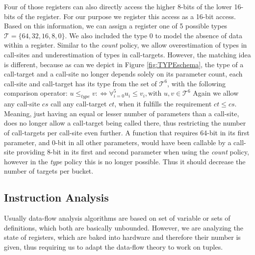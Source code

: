Four of those registers can also directly access the higher 8-bits of the lower 16-bits of the register. For our purpose we register this access as a 16-bit access. 
Based on this information,
we can assign a register one of 5 possible types $\mathcal{T} = \{64, 32, 16, 8, 0\}$. We also included the type 0 to model the absence of data within a register. 
Similar to the \emph{count} policy, we allow overestimation of types in call-sites and underestimation of types in call-targets. However, the matching idea is different, 
because as can we depict in Figure \ref{fig:TYPEschema}, the type of a call-target and a call-site no longer depends solely on its parameter count, 
each call-site and call-target has its type from the set of $\mathcal{T}^6$, with the following comparison operator:
$
	u \leq_{type} v :\Longleftrightarrow  
	\forall_{i = 0}^{5} {u_i \leq v_i} , \text {with } u, v \in \mathcal{T}^6
$
Again we allow any call-site $cs$ call any call-target $ct$, when it fulfills the requirement $ct \leq cs$. 
Meaning, just having an equal or lesser number of parameters than a call-site, does no longer allow a call-target being called there, thus restricting the number of call-targets per 
call-site even further. A function that requires 64-bit in its first parameter, and 0-bit in all other parameters, would have been callable by a call-site providing 8-bit 
in its first and second parameter when using the \emph{count} policy, however in the \emph{type} policy this is no longer possible. Thus it should decrease the number of targets per bucket.


\subsection{Instruction Analysis}
\label{section:instructionanalysis}
Usually data-flow analysis algorithms are based on set of variable or sets of definitions, which both are basically unbounded. However, we are analyzing the state of registers, which are baked into hardware and therefore their number is given, thus requiring us to adapt the data-flow theory to work on tuples.

